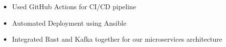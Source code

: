 \begin{itemize}
  \item Used GitHub Actions for CI/CD pipeline
  \item Automated Deployment using Ansible 
  \item Integrated Rust and Kafka together for our microservices architecture
\end{itemize}
\vspace{4pt}

